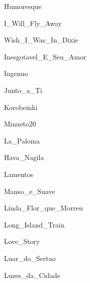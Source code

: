 \documentclass{scrartcl}
\begin{document}

{Humoresque}


{I_Will_Fly_Away}


{Wish_I_Was_In_Dixie}


{Inesgotavel_E_Seu_Amor}


{Ingenuo}


{Junto_a_Ti}


{Korobeinki}


{Minueto20}


{La_Paloma}


{Hava_Nagila}


{Lamentos}


{Manso_e_Suave}


{Linda_Flor_que_Morreu}


{Long_Island_Train}


{Love_Story}


{Luar_do_Sertao}


{Luzes_da_Cidade}
\end{document}
